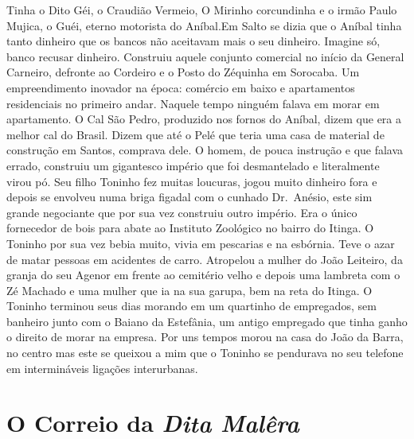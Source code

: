 \documentclass[12pt,brazil,]{book}
\begin{document}
Tinha o Dito Géi, o Craudião Vermeio, O Mirinho corcundinha e o irmão
Paulo Mujica, o Guéi, eterno motorista do Aníbal.Em Salto se dizia que o
Aníbal tinha tanto dinheiro que os bancos não aceitavam mais o seu
dinheiro. Imagine só, banco recusar dinheiro. Construiu aquele conjunto
comercial no início da General Carneiro, defronte ao Cordeiro e o Posto
do Zéquinha em Sorocaba. Um empreendimento inovador na época: comércio
em baixo e apartamentos residenciais no primeiro andar. Naquele tempo
ninguém falava em morar em apartamento. O Cal São Pedro, produzido nos
fornos do Aníbal, dizem que era a melhor cal do Brasil. Dizem que até o
Pelé que teria uma casa de material de construção em Santos, comprava
dele. O homem, de pouca instrução e que falava errado, construiu um
gigantesco império que foi desmantelado e literalmente virou pó. Seu
filho Toninho fez muitas loucuras, jogou muito dinheiro fora e depois se
envolveu numa briga figadal com o cunhado Dr.~Anésio, este sim grande
negociante que por sua vez construiu outro império. Era o único
fornecedor de bois para abate ao Instituto Zoológico no bairro do
Itinga. O Toninho por sua vez bebia muito, vivia em pescarias e na
esbórnia. Teve o azar de matar pessoas em acidentes de carro. Atropelou
a mulher do João Leiteiro, da granja do seu Agenor em frente ao
cemitério velho e depois uma lambreta com o Zé Machado e uma mulher que
ia na sua garupa, bem na reta do Itinga. O Toninho terminou seus dias
morando em um quartinho de empregados, sem banheiro junto com o Baiano
da Estefânia, um antigo empregado que tinha ganho o direito de morar na
empresa. Por uns tempos morou na casa do João da Barra, no centro mas
este se queixou a mim que o Toninho se pendurava no seu telefone em
intermináveis ligações interurbanas.

\section{\texorpdfstring{O Correio da \emph{Dita
Malêra}}{O Correio da Dita Malêra}}\label{o-correio-da-dita-maluxeara}
\end{document}
